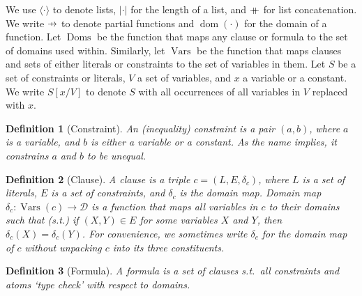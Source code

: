 \documentclass{article}
\newtheorem{definition}{Definition}
\newcommand\pfun{\mathrel{\ooalign{\hfil$\mapstochar\mkern5mu$\hfil\cr$\to$\cr}}}
\newcommand\mdoubleplus{\mathbin{+\mkern-10mu+}}
\DeclareMathOperator{\dom}{dom}
\DeclareMathOperator{\Doms}{Doms}
\DeclareMathOperator{\Vars}{Vars}
\begin{document}
We use $\langle\cdot\rangle$ to denote lists, $|\cdot|$ for the length of a
list, and $\mdoubleplus$ for list concatenation. We write $\pfun$ to denote
partial functions and $\dom(\cdot)$ for the domain of a function. Let $\Doms$ be
the function that maps any clause or formula to the set of domains used within.
Similarly, let $\Vars$ be the function that maps clauses and sets of either
literals or constraints to the set of variables in them. Let $S$ be a set of
constraints or literals, $V$ a set of variables, and $x$ a variable or a
constant. We write $S[x/V]$ to denote $S$ with all occurrences of all variables
in $V$ replaced with $x$.

\begin{definition}[Constraint]\label{def:constraint}
  An \emph{(inequality) constraint} is a pair $(a, b)$, where $a$ is a variable,
  and $b$ is either a variable or a constant. As the name implies, it constrains
  $a$ and $b$ to be unequal.
\end{definition}

\begin{definition}[Clause]\label{def:clause}
  A \emph{clause} is a triple $c = (L, E, \delta_c)$, where $L$ is a set of
  literals, $E$ is a set of constraints, and $\delta_c$ is the domain map.
  \emph{Domain map} $\delta_{c}\colon \Vars(c) \to \mathcal{D}$ is a function
  that maps all variables in $c$ to their domains such that (s.t.) if
  $(X, Y) \in E$ for some variables $X$ and $Y$, then
  $\delta_c(X) = \delta_c(Y)$. For convenience, we sometimes write $\delta_c$
  for the domain map of $c$ without unpacking $c$ into its three constituents.
\end{definition}

\begin{definition}[Formula]\label{def:formula}
  A \emph{formula} is a set of clauses s.t.\ all constraints and atoms `type
  check' with respect to domains.
\end{definition}
\end{document}
